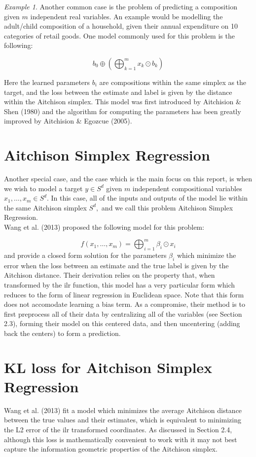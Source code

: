 \documentclass[BSc]{usydthesis}
\numberwithin{equation}{chapter}
\theoremstyle{remark}
\newtheorem{Example}[equation]{Example}
\begin{document}
\begin{Example}
 Another common case is the problem of predicting a composition given $m$ independent real variables. An example would be modelling the adult/child composition of a household, given their annual expenditure on 10 categories of retail goods. One model commonly used for this problem is the following:
 
 $$ b_0 \oplus \left( \bigoplus_{k=1}^m x_k \odot b_k \right)$$
 
 Here the learned parameters $b_i$ are compositions within the same simplex as the target, and the loss between the estimate and label is given by the distance within the Aitchison simplex. This model was first introduced by Aitchision \& Shen (1980) and the algorithm for computing the parameters has been greatly improved by Aitchision \& Egozcue (2005).
\end{Example}




\section{Aitchison Simplex Regression}

Another special case, and the case which is the main focus on this report, is when we wish to model a target $y \in S^d$ given $m$ independent compositional variables $x_1,\ldots, x_m \in S^d.$ In this case, all of the inputs and outputs of the model lie within the same Aitchison simplex $S^d,$ and we call this problem Aitchison Simplex Regression. \\

Wang et al. (2013) proposed the following model for this problem:

$$ f(x_1, \ldots, x_m) = \bigoplus_{i=1}^m \beta_i \odot x_i $$ and provide a closed form solution for the parameters $\beta_i$ which minimize the error when the loss between an estimate and the true label is given by the Aitchison distance. Their derivation relies on the property that, when transformed by the ilr function, this model has a very particular form which reduces to the form of linear regression in Euclidean space. Note that this form does not accomodate learning a bias term. As a compromise, their method is to first preprocess all of their data by centralizing all of the variables (see Section 2.3), forming their model on this centered data, and then uncentering (adding back the centers) to form a prediction.  

\section{KL loss for Aitchison Simplex Regression}
Wang et al. (2013) fit a model which minimizes the average Aitchison distance between the true values and their estimates, which is equivalent to minimizing the L2 error of the ilr transformed coordinates. As discussed in Section 2.4, although this loss is mathematically convenient to work with it may not best capture the information geometric properties of the Aitchison simplex. \\
\end{document}
